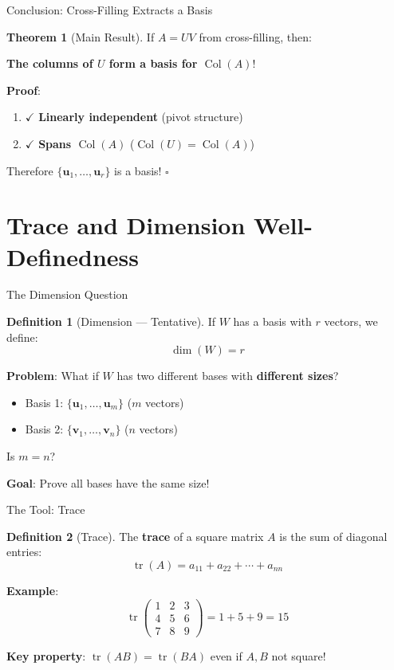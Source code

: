 \documentclass[10pt]{beamer}
\theoremstyle{definition}
\newtheorem{defi}{Definition}[section]
\newtheorem{thm}{Theorem}[section]
\newcommand{\x}[1]{\alert{\textbf{#1}}}
\begin{document}
\begin{frame}{Conclusion: Cross-Filling Extracts a Basis}
\begin{thm}[Main Result]
If $A = UV$ from cross-filling, then:

\x{The columns of $U$ form a basis for $\operatorname{Col}(A)$}!
\end{thm}

\vfill
\textbf{Proof}:
\begin{enumerate}
\item $\checkmark$ \x{Linearly independent} (pivot structure)
\item $\checkmark$ \x{Spans $\operatorname{Col}(A)$} ($\operatorname{Col}(U) = \operatorname{Col}(A)$)
\end{enumerate}

Therefore $\{\mathbf{u}_1, \ldots, \mathbf{u}_r\}$ is a basis! $\square$
\end{frame}

\section{Trace and Dimension Well-Definedness}

\begin{frame}{The Dimension Question}
\begin{defi}[Dimension — Tentative]
If $W$ has a basis with $r$ vectors, we define:
$$\dim(W) = r$$
\end{defi}

\vfill
\x{Problem}: What if $W$ has two different bases with \x{different sizes}?

\begin{itemize}
\item Basis 1: $\{\mathbf{u}_1, \ldots, \mathbf{u}_m\}$ ($m$ vectors)
\item Basis 2: $\{\mathbf{v}_1, \ldots, \mathbf{v}_n\}$ ($n$ vectors)
\end{itemize}

Is $m = n$?

\vfill
\x{Goal}: Prove all bases have the same size!
\end{frame}

\begin{frame}{The Tool: Trace}
\begin{defi}[Trace]
The \x{trace} of a square matrix $A$ is the sum of diagonal entries:
$$\operatorname{tr}(A) = a_{11} + a_{22} + \cdots + a_{nn}$$
\end{defi}

\vfill
\x{Example}:
$$\operatorname{tr}\begin{pmatrix} 1 & 2 & 3 \\ 4 & 5 & 6 \\ 7 & 8 & 9 \end{pmatrix} = 1 + 5 + 9 = 15$$

\vfill
\x{Key property}: $\operatorname{tr}(AB) = \operatorname{tr}(BA)$ even if $A, B$ not square!
\end{frame}
\end{document}
